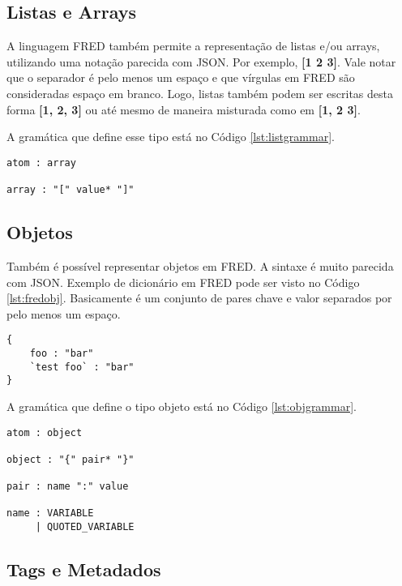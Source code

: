 \subsection{Listas e Arrays}

A linguagem FRED também permite a representação de listas e/ou arrays, utilizando uma notação parecida com JSON.
Por exemplo, \textbf{[1 2 3]}. Vale notar que o separador é pelo menos um espaço e que vírgulas em FRED
são consideradas espaço em branco. Logo, listas também podem ser escritas desta forma \textbf{[1, 2, 3]} ou 
até mesmo de maneira misturada como em \textbf{[1, 2 3]}.

A gramática que define esse tipo está no Código \ref{lst:listgrammar}.

\begin{lstlisting}[caption=Gramática para listas,label={lst:listgrammar}]
atom : array

array : "[" value* "]"
\end{lstlisting}

\subsection{Objetos}

Também é possível representar objetos em FRED. A sintaxe é muito parecida com JSON. 
Exemplo de dicionário em FRED pode ser visto no Código \ref{lst:fredobj}. Basicamente é um conjunto de pares 
chave e valor separados por pelo menos um espaço.

\begin{lstlisting}[caption=Exemplo de dicionário em FRED chaves com espaços são escapados com backticks,label={lst:fredobj}]
{
    foo : "bar"
    `test foo` : "bar"
}
\end{lstlisting}

A gramática que define o tipo objeto está no Código \ref{lst:objgrammar}.

\begin{lstlisting}[caption=Gramática para objetos,label={lst:objgrammar}]
atom : object

object : "{" pair* "}"

pair : name ":" value

name : VARIABLE
     | QUOTED_VARIABLE
\end{lstlisting}
    
\subsection{Tags e Metadados}

